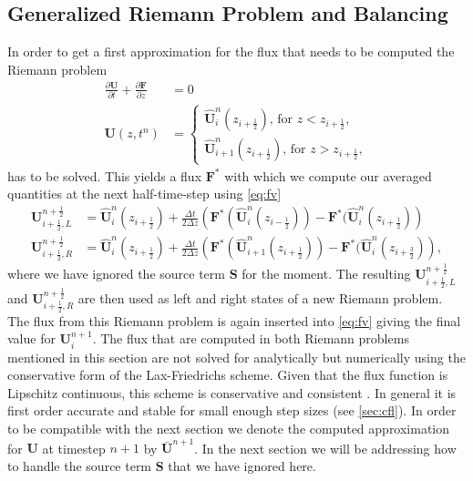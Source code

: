 \documentclass[a4paper, oneside]{discothesis}
\begin{document}
\subsection{Generalized Riemann Problem and Balancing} \label{ssec:grp}
In order to get a first approximation for the flux that needs to be computed the Riemann problem
\begin{align}
	\frac{\partial \mathbf{U}}{\partial t} + \frac{\partial \mathbf{F}}{\partial z} &= 0 \\
	\mathbf{U}(z,t^n) &= \left\{
		\begin{array}{c}
			\mathbf{\hat{U}}_i^n(z_{i+\frac{1}{2}}) \text{, for } z < z_{i+\frac{1}{2}}, \\
			\mathbf{\hat{U}}_{i+1}^n(z_{i+\frac{1}{2}}) \text{, for } z > z_{i+\frac{1}{2}},
	\end{array} \right.  
	\end{align}
	has to be solved.
	This yields a flux $\mathbf{F^*}$ with which we compute our averaged quantities at the next half-time-step using \autoref{eq:fv}
	\begin{align}
		\mathbf{U}_{i+\frac{1}{2},L}^{n+\frac{1}{2}} &= \mathbf{\hat{U}}_i^n(z_{i+\frac{1}{2}}) + \frac{\Delta t}{2 \Delta z} \left( \mathbf{F^*}(\mathbf{\hat{U}}_i^n( z_{i-\frac{1}{2}})) - \mathbf{F^*}(\mathbf{\hat{U}}_i^n(z_{i+\frac{1}{2}}) \right)\\
		\mathbf{U}_{i+\frac{1}{2},R}^{n+\frac{1}{2}} &= \mathbf{\hat{U}}_i^n(z_{i+\frac{1}{2}}) + \frac{\Delta t}{2 \Delta z} \left( \mathbf{F^*}(\mathbf{\hat{U}}_{i+1}^n( z_{i+\frac{1}{2}})) - \mathbf{F^*}(\mathbf{\hat{U}}_i^n(z_{i+\frac{3}{2}}) \right),
	\end{align}
	where we have ignored the source term $\mathbf{S}$ for the moment.
	The resulting $\mathbf{U}_{i+\frac{1}{2},L}^{n+\frac{1}{2}}$ and $\mathbf{U}_{i+\frac{1}{2},R}^{n+\frac{1}{2}}$ are then used as left and right states of a new Riemann problem.
	The flux from this Riemann problem is again inserted into \autoref{eq:fv} giving the final value for $\mathbf{U}_i^{n+1}$.
	The flux that are computed in both Riemann problems mentioned in this section are not solved for analytically but numerically using the conservative form of the Lax-Friedrichs scheme.
	Given that the flux function is Lipschitz continuous, this scheme is conservative and consistent \cite{köppl2023dimension}.
	In general it is first order accurate and stable for small enough step sizes (see \autoref{sec:cfl}). \cite{leveque1992numerical}
	In order to be compatible with the next section we denote the computed approximation for $\mathbf{U}$ at timestep $n+1$ by $\bar{\mathbf{U}}^{n+1}$.
	In the next section we will be addressing how to handle the source term $\mathbf{S}$ that we have ignored here.
\end{document}
